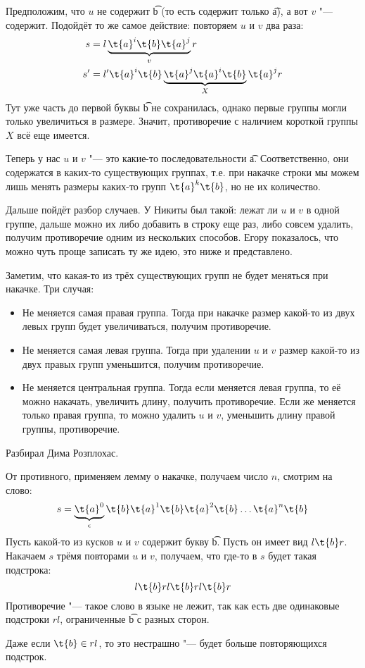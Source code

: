 	Предположим, что $u$ не содержит \t{b} (то есть содержит только \t{a}), а вот $v$ "--- содержит.
	Подойдёт то же самое действие: повторяем $u$ и $v$ два раза:
	\begin{align*}
		s &= l \underbrace{\t{a}^i\t{b}\t{a}^j}_v r \\
		s' &= l' \t{a}^i\t{b}\underbrace{\t{a}^j \t{a}^i\t{b}}_X\t{a}^j r
	\end{align*}
	Тут уже часть до первой буквы \t{b} не сохранилась, однако первые группы могли только увеличиться в размере.
	Значит, противоречие с наличием короткой группы $X$ всё еще имеется.

	Теперь у нас $u$ и $v$ "--- это какие-то последовательности \t{a}.
	Соответственно, они содержатся в каких-то существующих группах, т.е. при накачке строки
	мы можем лишь менять размеры каких-то групп $\t{a}^k\t{b}$, но не их количество.

	\begin{Rem}
		Дальше пойдёт разбор случаев.
		У Никиты был такой: лежат ли $u$ и $v$ в одной группе, дальше можно их либо
		добавить в строку еще раз, либо совсем удалить, получим противоречие одним из нескольких способов.
		Егору показалось, что можно чуть проще записать ту же идею, это ниже и представлено.
	\end{Rem}
	Заметим, что какая-то из трёх существующих групп не будет меняться при накачке.
	Три случая:
	\begin{itemize}
		\item
			Не меняется самая правая группа.
			Тогда при накачке размер какой-то из двух левых групп будет увеличиваться, получим противоречие.
		\item
			Не меняется самая левая группа.
			Тогда при удалении $u$ и $v$ размер какой-то из двух правых групп уменьшится, получим противоречие.
		\item
			Не меняется центральная группа.
			Тогда если меняется левая группа, то её можно накачать, увеличить длину, получить противоречие.
			Если же меняется только правая группа, то можно удалить $u$ и $v$, уменьшить длину правой группы, противоречие.
	\end{itemize}

	Разбирал Дима Розплохас.

	От противного, применяем лемму о накачке, получаем число $n$, смотрим на слово:
	\[ s =\underbrace{\t{a}^{0}}_{\epsilon}\t{b} \t{a}^{1}\t{b} \t{a}^{2}\t{b} \dots \t{a}^{n}\t{b} \]
	Пусть какой-то из кусков $u$ и $v$ содержит букву \t{b}.
	Пусть он имеет вид $l\t{b}r$.
	Накачаем $s$ трёмя повторами $u$ и $v$, получаем, что где-то в $s$ будет такая подстрока:
	\[ l\t{b}rl\t{b}rl\t{b}r \]
	Противоречие "--- такое слово в языке не лежит, так как есть две одинаковые подстроки $rl$,
	ограниченные \t{b} с разных сторон.
	\begin{Rem}
		Даже если $\t{b} \in rl$, то это нестрашно "--- будет больше повторяющихся подстрок.
	\end{Rem}


